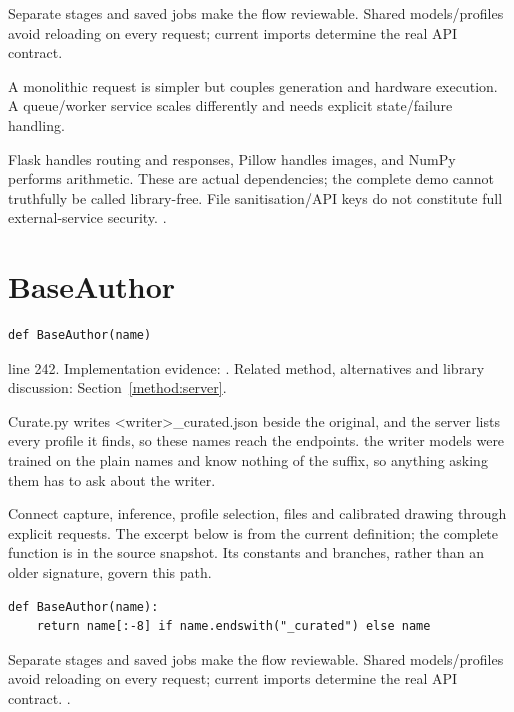 Separate stages and saved jobs make the flow reviewable. Shared models/profiles avoid reloading on every request; current imports determine the real API contract.


A monolithic request is simpler but couples generation and hardware execution. A queue/worker service scales differently and needs explicit state/failure handling.


Flask handles routing and responses, Pillow handles images, and NumPy performs arithmetic. These are actual dependencies; the complete demo cannot truthfully be called library-free. File sanitisation/API keys do not constitute full external-service security. \cite{flaskdocs,pillowops,code2026}.


\section{BaseAuthor}\label{fn:web-server:BaseAuthor}
\begin{lstlisting}[style=sig]
def BaseAuthor(name)
\end{lstlisting}
 line 242. Implementation evidence: \cite{code2026}. Related method, alternatives and library discussion: Section~\ref{method:server}.


Curate.py writes <writer>\_curated.json beside the original, and the server lists every profile it finds, so these names reach the endpoints.  the writer models were trained on the plain names and know nothing of the suffix, so anything asking them has to ask about the writer.


Connect capture, inference, profile selection, files and calibrated drawing through explicit requests. The excerpt below is from the current definition; the complete function is in the source snapshot. Its constants and branches, rather than an older signature, govern this path.


\begin{lstlisting}[style=plain]
def BaseAuthor(name):
    return name[:-8] if name.endswith("_curated") else name
\end{lstlisting}
Separate stages and saved jobs make the flow reviewable. Shared models/profiles avoid reloading on every request; current imports determine the real API contract. \cite{flaskdocs,pillowops,code2026}.


